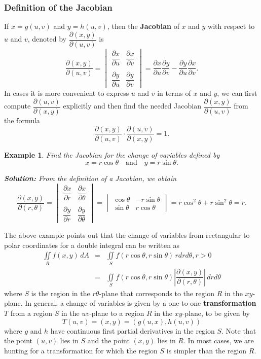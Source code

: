 \documentclass[titlepage,a4paper,12pt]{report}
\newtheorem{example}{Example}[section]
\begin{document}
\subsubsection{Definition of the Jacobian}
If $x=g(u,v)$ and $y=h(u,v)$, then the \textbf{Jacobian} of $x$ and $y$ with respect to $u$ and $v$, denoted by $\dfrac{\partial (x,y)}{\partial (u,v)}$ is 
\[\dfrac{\partial (x,y)}{\partial (u,v)} =\begin{vmatrix}
\dfrac{\partial x}{\partial u} & \dfrac{\partial x}{\partial v} \\~\\
\dfrac{\partial y}{\partial u} & \dfrac{\partial y}{\partial v}
\end{vmatrix} =\dfrac{\partial x}{\partial u}\dfrac{\partial y}{\partial v}-\dfrac{\partial y}{\partial u}\dfrac{\partial x}{\partial v}. \]
In cases it is more convenient to express $u$ and $v$ in terms of $x$ and $y$, we can first compute $\dfrac{\partial (u,v)}{\partial (x,y)}$ explicitly and then find the needed Jacobian $\dfrac{\partial (x,y)}{\partial (u,v)}$ from the formula
\[\dfrac{\partial (x,y)}{\partial (u,v)}\cdot \dfrac{\partial (u,v)}{\partial (x,y)}=1.\]
\begin{example}
Find the Jacobian for the change of variables defined by 
\[x=r\cos \theta \quad \mbox{and} \quad y=r\sin \theta.\]

\noindent \textbf{Solution:} From the definition of a Jacobian, we obtain 
\[\dfrac{\partial (x,y)}{\partial (r,\theta)} =\begin{vmatrix}
\dfrac{\partial x}{\partial r} & \dfrac{\partial x}{\partial \theta} \\~\\
\dfrac{\partial y}{\partial r} & \dfrac{\partial y}{\partial \theta}
\end{vmatrix}=\begin{vmatrix}
\cos \theta & -r\sin \theta \\
\sin \theta & r\cos \theta
\end{vmatrix} =r\cos ^2 \theta +r\sin ^2 \theta =r.\]
\end{example}
\noindent The above example points out that the change of variables from rectangular to polar coordinates for a double integral can be written as 
\begin{eqnarray*}
\iint \limits _R f(x,y)\, dA &=& \iint \limits _S f(r\cos \theta , r \sin \theta)\, rdrd\theta , r>0 \\
&=& \iint \limits _S f(r\cos \theta , r \sin \theta)\left|\dfrac{\partial (x,y)}{\partial (r, \theta)}\right|\, drd\theta 
\end{eqnarray*}
where $S$ is the region in the $r\theta$-plane that corresponds to the region $R$ in the $xy$-plane. In general, a change of variables is given by a one-to-one \textbf{transformation} $T$ from a region $S$ in the $uv$-plane to a region $R$ in the $xy$-plane, to be given by 
\[T(u,v)=(x,y)=(g(u,x), h(u,v))\] where $g$ and $h$ have continuous first partial derivatives in the region $S$. Note that the point $(u,v)$ lies in $S$ and the point $(x,y)$ lies in $R$. In most cases, we are hunting for a transformation for which the region $S$ is simpler than the region $R$.
\end{document}
